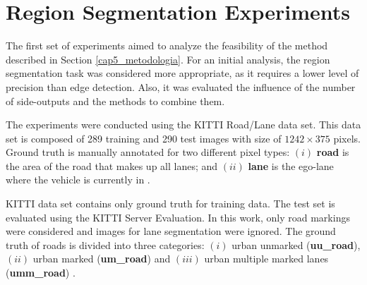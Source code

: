 \section{Region Segmentation Experiments}
\label{cap6_result_experm_1}

The first set of experiments aimed to analyze the feasibility of the method described in Section \ref{cap5_metodologia}.
For an initial analysis, the region segmentation task was considered more appropriate, as it requires a lower level of precision than edge detection.
Also, it was evaluated the influence of the number of side-outputs and the methods to combine them.

The experiments were conducted using the KITTI Road/Lane data set.
This data set is composed of 289 training and 290 test images with size of $1242 \times 375$ pixels. 
Ground truth is manually annotated for two different pixel types: $(i)$ \textbf{road} is the area of the road that makes up all lanes; and $(ii)$ \textbf{lane} is the ego-lane where the vehicle is currently in \cite{Fritsch2013ITSC}.

KITTI data set contains only ground truth for training data.
The test set is evaluated using the KITTI Server Evaluation.
In this work, only road markings were considered and images for lane segmentation were ignored.
The ground truth of roads is divided into three categories: $(i)$ urban unmarked (\textbf{uu\_road}), $(ii)$ urban marked (\textbf{um\_road}) and $(iii)$ urban multiple marked lanes (\textbf{umm\_road}) \cite{Fritsch2013ITSC}.

